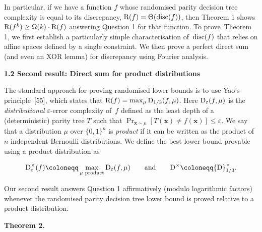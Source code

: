 \documentclass[10pt,a4paper]{article}
\begin{document}



In particular, if we have a function $f$ whose randomised parity decision tree complexity is equal to its discrepancy, ${\textup{R}}(f)=\Theta({\textup{disc}}(f))$, then Theorem 1 shows ${\textup{R}}(f^{k})\geq\Omega(k)\cdot{\textup{R}}(f)$ answering Question 1 for that function. To prove Theorem 1, we first establish a particularly simple characterisation of ${\textup{disc}}(f)$ that relies on affine spaces defined by a single constraint. We then prove a perfect direct sum (and even an XOR lemma) for discrepancy using Fourier analysis.\par





\par\medskip\noindent\textbf{
1.2 Second result: Direct sum for product distributions}\par




The standard approach for proving randomised lower bounds is to use Yao’s principle [55], which states that ${\textup{R}}(f)=\max_{\mu}{\textup{D}}_{1/3}(f,\mu)$. Here ${\textup{D}}_{\varepsilon}(f,\mu)$ is the \emph{distributional} $\varepsilon$-error complexity of $f$ defined as the least depth of a (deterministic) parity tree $T$ such that $\Pr_{\bm{x}\sim\mu}[T(\bm{x})\neq f(\bm{x})]\leq\varepsilon$. We say that a distribution $\mu$ over $\{0,1\}^{n}$ is \emph{product} if it can be written as the product of $n$ independent Bernoulli distributions. We define the best lower bound provable using a product distribution as\par


\[\begin{gathered}
{\textup{D}}^{\times}_{\varepsilon}(f)\coloneqq\max_{\mu\text{ product}}{\textup{D}}_{\varepsilon}(f,\mu)\qquad\text{and}\qquad{\textup{D}}^{\times}\coloneqq{\textup{D}}^{\times}_{1/3}.
\end{gathered}\]


Our second result answers Question 1 affirmatively (modulo logarithmic factors) whenever the randomised parity decision tree lower bound is proved relative to a product distribution.\par





\par\medskip\noindent\textbf{
\textbf{Theorem 2}\textbf{.}
}\par
\end{document}
